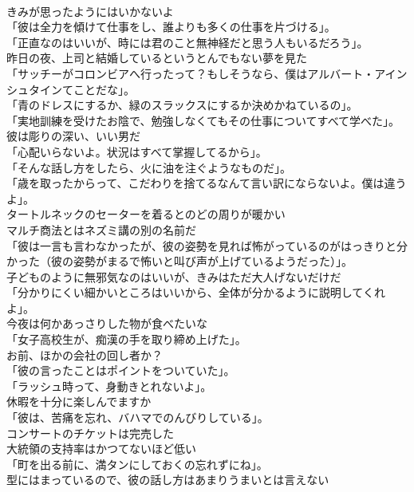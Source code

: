 \documentclass[8pt]{extreport}
\begin{document}
\begin{CJK}{UTF8}{min}
\\	きみが思ったようにはいかないよ	
\\	「彼は全力を傾けて仕事をし、誰よりも多くの仕事を片づける」。	
\\	「正直なのはいいが、時には君のこと無神経だと思う人もいるだろう」。	
\\	昨日の夜、上司と結婚しているというとんでもない夢を見た	
\\	「サッチーがコロンビアへ行ったって？もしそうなら、僕はアルバート・アインシュタインてことだな」。	
\\	「青のドレスにするか、緑のスラックスにするか決めかねているの」。	
\\	「実地訓練を受けたお陰で、勉強しなくてもその仕事についてすべて学べた」。	
\\	彼は彫りの深い、いい男だ	
\\	「心配いらないよ。状況はすべて掌握してるから」。	
\\	「そんな話し方をしたら、火に油を注ぐようなものだ」。	
\\	「歳を取ったからって、こだわりを捨てるなんて言い訳にならないよ。僕は違うよ」。	
\\	タートルネックのセーターを着るとのどの周りが暖かい	
\\	マルチ商法とはネズミ講の別の名前だ	
\\	「彼は一言も言わなかったが、彼の姿勢を見れば怖がっているのがはっきりと分かった（彼の姿勢がまるで怖いと叫び声が上げているようだった）」。	
\\	子どものように無邪気なのはいいが、きみはただ大人げないだけだ	
\\	「分かりにくい細かいところはいいから、全体が分かるように説明してくれよ」。	
\\	今夜は何かあっさりした物が食べたいな	
\\	「女子高校生が、痴漢の手を取り締め上げた」。	
\\	お前、ほかの会社の回し者か？	
\\	「彼の言ったことはポイントをついていた」。	
\\	「ラッシュ時って、身動きとれないよ」。	
\\	休暇を十分に楽しんでますか	
\\	「彼は、苦痛を忘れ、バハマでのんびりしている」。	
\\	コンサートのチケットは完売した	
\\	大統領の支持率はかつてないほど低い	
\\	「町を出る前に、満タンにしておくの忘れずにね」。	
\\	型にはまっているので、彼の話し方はあまりうまいとは言えない	

\end{CJK}
\end{document}
